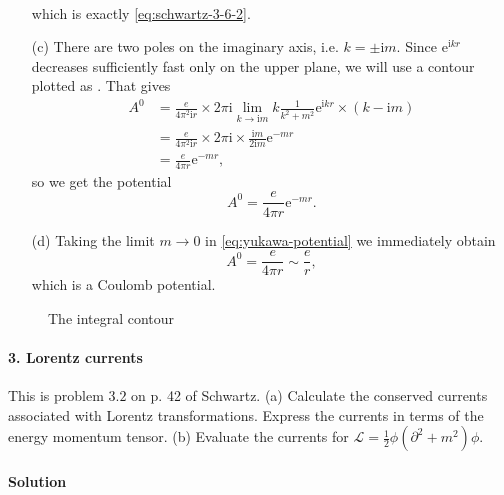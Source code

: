 \documentclass[hyperref, a4paper]{article}
\newcommand*{\ii}{\mathrm{i}}
\newcommand*{\ee}{\mathrm{e}}
\begin{document}
\begin{itemize}
\[\begin{aligned}
        \end{aligned}
    \]
    which is exactly \eqref{eq:schwartz-3-6-2}.
    \item[(c)] There are two poles on the imaginary axis, i.e. $k = \pm \ii m$. 
    Since $\ee^{\ii k r}$ decreases sufficiently fast only on the upper plane, we will use a contour plotted as . That gives 
    \[
        \begin{aligned}
            A^0 &= \frac{e}{4\pi^2 \ii r} \times 2 \pi \ii \lim_{k \to \ii m} k \frac{1}{k^2 + m^2} \ee^{\ii k r} \times (k - \ii m) \\
            &= \frac{e}{4\pi^2 \ii r} \times 2\pi \ii \times \frac{\ii m}{2 \ii m} \ee^{- m r} \\
            &= \frac{e}{4 \pi r} \ee^{- m r},
        \end{aligned}
    \] 
    so we get the potential 
    \begin{equation}
        A^0 = \frac{e}{4 \pi r} \ee^{- m r}.
        \label{eq:yukawa-potential}
    \end{equation}
    \item[(d)] Taking the limit $m \to 0$ in \eqref{eq:yukawa-potential} we immediately obtain
    \begin{equation}
        A^0 = \frac{e}{4 \pi r} \sim \frac{e}{r},
    \end{equation} 
    which is a Coulomb potential.
\end{itemize}

\begin{figure}
    \centering
    
    \caption{The integral contour}
    \label{fig:integral-cont-1}
\end{figure}

\paragraph{3. Lorentz currents} This is problem $3.2$ on p. 42 of Schwartz.
(a) Calculate the conserved currents associated with Lorentz transformations. Express the currents in terms of the energy momentum tensor.
(b) Evaluate the currents for $\mathcal{L}=\frac{1}{2} \phi\left(\partial^{2}+m^{2}\right) \phi$.

\paragraph{Solution} 
\end{document}
